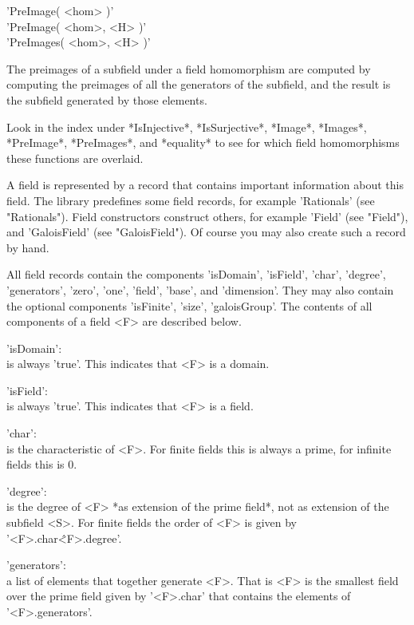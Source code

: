 \vspace{5mm}
'PreImage( <hom> )' \\
'PreImage( <hom>, <H> )' \\
'PreImages( <hom>, <H> )'

The preimages of a subfield  under a  field  homomorphism are computed by
computing the  preimages of all the generators  of  the subfield, and the
result is the subfield generated by those elements.

Look in the index under *IsInjective*, *IsSurjective*, *Image*, *Images*,
*PreImage*,   *PreImages*, and   *equality*   to   see for  which   field
homomorphisms these functions are overlaid.


A field is represented by  a record  that contains important  information
about this field.  The {\GAP} library predefines some  field records, for
example  'Rationals'  (see  "Rationals").  Field  constructors  construct
others,  for  example  'Field'  (see  "Field"),  and  'GaloisField'  (see
"GaloisField").  Of course you may also create such a record by hand.

All field  records contain the  components 'isDomain', 'isField', 'char',
'degree', 'generators', 'zero',  'one', 'field', 'base', and 'dimension'.
They  may  also   contain the  optional  components  'isFinite',  'size',
'galoisGroup'.   The  contents  of  all  components of   a field <F>  are
described below.

'isDomain': \\
        is always 'true'.  This indicates that <F> is a domain.

'isField': \\
        is always 'true'.  This indicates that <F> is a field.

'char': \\
        is the characteristic of <F>.  For finite fields this is always a
        prime, for infinite fields this is 0.

'degree': \\
        is the degree of  <F> *as extension of the  prime field*,  not as
        extension of  the subfield <S>.   For finite fields the  order of
        <F> is given by '<F>.char\^ <F>.degree'.

'generators': \\
        a list of elements  that together generate <F>.   That is  <F> is
        the smallest field over the prime  field given by '<F>.char' that
        contains the elements of '<F>.generators'.

